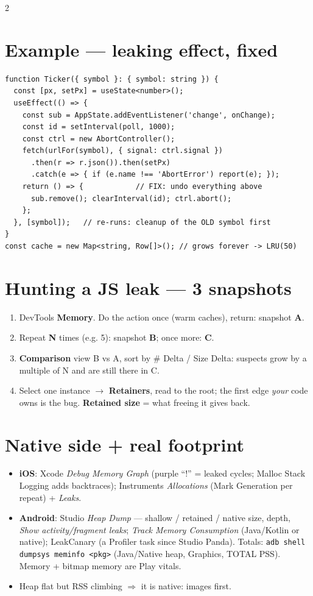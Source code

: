 \documentclass[8pt]{extarticle}
\begin{document}
\begin{multicols}{2}
\section{Example — leaking effect, fixed}
\begin{lstlisting}[language=TSSheet]
function Ticker({ symbol }: { symbol: string }) {
  const [px, setPx] = useState<number>();
  useEffect(() => {
    const sub = AppState.addEventListener('change', onChange);
    const id = setInterval(poll, 1000);
    const ctrl = new AbortController();
    fetch(urlFor(symbol), { signal: ctrl.signal })
      .then(r => r.json()).then(setPx)
      .catch(e => { if (e.name !== 'AbortError') report(e); });
    return () => {            // FIX: undo everything above
      sub.remove(); clearInterval(id); ctrl.abort();
    };
  }, [symbol]);   // re-runs: cleanup of the OLD symbol first
}
const cache = new Map<string, Row[]>(); // grows forever -> LRU(50)
\end{lstlisting}

\section{Hunting a JS leak — 3 snapshots}
\begin{enumerate}\raggedright
  \item DevTools \textbf{Memory}. Do the action once (warm caches), return: snapshot \textbf{A}.
  \item Repeat \textbf{N} times (e.g. 5): snapshot \textbf{B}; once more: \textbf{C}.
  \item \textbf{Comparison} view B vs A, sort by \# Delta / Size Delta: suspects grow by a
        multiple of N and are still there in C.
  \item Select one instance $\to$ \textbf{Retainers}, read to the root; the first edge
        \emph{your} code owns is the bug. \textbf{Retained size} = what freeing it gives back.
\end{enumerate}

\section{Native side + real footprint}
\begin{itemize}\raggedright
  \item \textbf{iOS}: Xcode \emph{Debug Memory Graph} (purple ``!'' = leaked cycles; Malloc
        Stack Logging adds backtraces); Instruments \emph{Allocations} (Mark Generation per
        repeat) + \emph{Leaks}.
  \item \textbf{Android}: Studio \emph{Heap Dump} — shallow / retained / native size, depth,
        \emph{Show activity/fragment leaks}; \emph{Track Memory Consumption} (Java/Kotlin or
        native); LeakCanary (a Profiler task since Studio Panda). Totals:
        \texttt{adb shell dumpsys meminfo <pkg>} (Java/Native heap, Graphics, TOTAL PSS).
        Memory + bitmap memory are Play vitals.
  \item Heap flat but RSS climbing $\Rightarrow$ it is native: images first.
\end{itemize}


\end{multicols}
\end{document}
